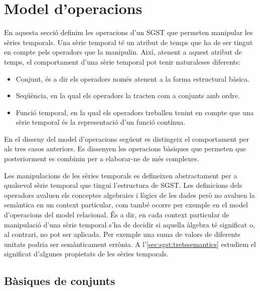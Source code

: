 \section{Model d'operacions}
\label{sec:model:sgst-operacions}

En aquesta secció definim les operacions d'un \gls{SGST} que permeten
manipular les sèries temporals.  Una sèrie temporal té un atribut de
temps que ha de ser tingut en compte pels operadors que la manipulin.
Així, atenent a aquest atribut de temps, el comportament d'una sèrie
temporal pot tenir naturaleses diferents:
\begin{itemize}
\item Conjunt, és a dir els operadors només atenent a la forma
  estructural bàsica.
\item Seqüència, en la qual els operadors la tracten com a conjunts
  amb ordre.
\item Funció temporal, en la qual els operadors treballen tenint en
  compte que una sèrie temporal és la representació d'un funció
  contínua.
\end{itemize}



En el disseny del model d'operacions següent es distingeix el
comportament per als tres casos anteriors.  Es dissenyen les
operacions bàsiques que permeten que posteriorment es combinin per
a elaborar-ne de més complexes.


Les manipulacions de les sèries temporals es defineixen abstractament
per a qualsevol sèrie temporal que tingui l'estructura de \gls{SGST}.
Les definicions dels operadors avaluen els conceptes algebraics i
lògics de les dades però no avaluen la semàntica en un context
particular, com també ocorre per exemple en el model d'operacions del
model relacional. És a dir, en cada context particular de manipulació
d'una sèrie temporal s'ha de decidir si aquella àlgebra té significat
o, al contrari, no pot ser aplicada. Per exemple una suma de valors de
diferents unitats podria ser semànticament errònia. A
l'\autoref{sec:sgst:tretssemantics} estudiem el significat d'algunes
propietats de les sèries temporals.





\subsection{Bàsiques de conjunts}

